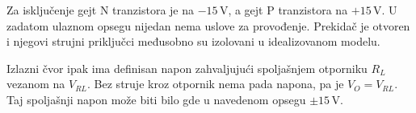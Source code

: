 Za isključenje gejt N tranzistora je na $-15\,\mathrm V$, a gejt P tranzistora na $+15\,\mathrm V$. U zadatom ulaznom opsegu nijedan nema uslove za provođenje. Prekidač je otvoren i njegovi strujni priključci međusobno su izolovani u idealizovanom modelu.

Izlazni čvor ipak ima definisan napon zahvaljujući spoljašnjem otporniku $R_L$ vezanom na $V_{RL}$. Bez struje kroz otpornik nema pada napona, pa je $V_O=V_{RL}$. Taj spoljašnji napon može biti bilo gde u navedenom opsegu $\pm15\,\mathrm V$.
